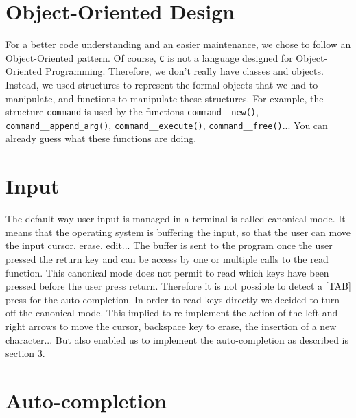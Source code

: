 \documentclass[fleqn]{article}
\begin{document}
\section{Object-Oriented Design}
\label{sec:oop}

For a better code understanding and an easier maintenance, we chose to follow an Object-Oriented pattern. Of course, \texttt{C} is not a language designed for Object-Oriented Programming. Therefore, we don't really have classes and objects. Instead, we used structures to represent the formal objects that we had to manipulate, and functions to manipulate these structures. For example, the structure \texttt{command} is used by the functions \texttt{command\_\_new()}, \texttt{command\_\_append\_arg()}, \texttt{command\_\_execute()}, \texttt{command\_\_free()}... You can already guess what these functions are doing.


\section{Input}

The default way user input is managed in a terminal is called canonical mode. It means that the operating system is buffering the input, so that the user can move the input cursor, erase, edit... The buffer is sent to the program once the user pressed the return key and can be access by one or multiple calls to the read function. This canonical mode does not permit to read which keys have been pressed before the user press return. Therefore it is not possible to detect a [TAB] press for the auto-completion. In order to read keys directly we decided to turn off the canonical mode. This implied to re-implement the action of the left and right arrows to move the cursor, backspace key to erase, the insertion of a new character... But also enabled us to implement the auto-completion as described is section \ref{sec:auto}.



\section{Auto-completion}
\label{sec:auto}
\end{document}
